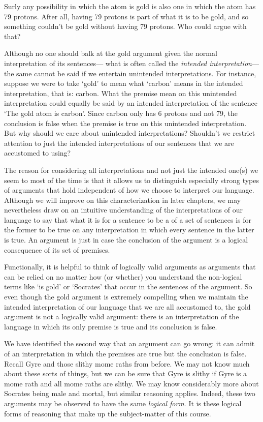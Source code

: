Surly any possibility in which the atom is gold is also one in which the atom has 79 protons.
After all, having 79 protons is part of what it is to be gold, and so something couldn't be gold without having 79 protons.
Who could argue with that?

Although no one should balk at the gold argument given the normal interpretation of its sentences--- what is often called the \textit{intended interpretation}--- the same cannot be said if we entertain unintended interpretations.
For instance, suppose we were to take `gold' to mean what `carbon' means in the intended interpretation, that is: carbon.
What the premise mean on this unintended interpretation could equally be said by an intended interpretation of the sentence `The gold atom is carbon'.
Since carbon only has 6 protons and not 79, the conclusion is false when the premise is true on this unintended interpretation.
But why should we care about unintended interpretations?
Shouldn't we restrict attention to just the intended interpretations of our sentences that we are accustomed to using?

The reason for considering all interpretations and not just the intended one(s) we seem to most of the time is that it allows us to distinguish especially strong types of arguments that hold independent of how we choose to interpret our language.
Although we will improve on this characterization in later chapters, we may nevertheless draw on an intuitive understanding of the interpretations of our language to say that what it is for a sentence to be a  of a set of sentences is for the former to be true on any interpretation in which every sentence in the latter is true. 
An argument is  just in case the conclusion of the argument is a logical consequence of its set of premises.

Functionally, it is helpful to think of logically valid arguments as arguments that can be relied on no matter how (or whether) you understand the non-logical terms like `is gold' or `Socrates' that occur in the sentences of the argument.
So even though the gold argument is extremely compelling when we maintain the intended interpretation of our language that we are all accustomed to, the gold argument is not a logically valid argument: there is an interpretation of the language in which its only premise is true and its conclusion is false.

We have identified the second way that an argument can go wrong: it can admit of an interpretation in which the premises are true but the conclusion is false.
Recall Gyre and those slithy mome raths from before.
We may not know much about these sorts of things, but we can be sure that Gyre is slithy if Gyre is a mome rath and all mome raths are slithy.
We may know considerably more about Socrates being male and mortal, but similar reasoning applies.
Indeed, these two arguments may be observed to have the same \textit{logical form}.
It is these logical forms of reasoning that make up the subject-matter of this course.

